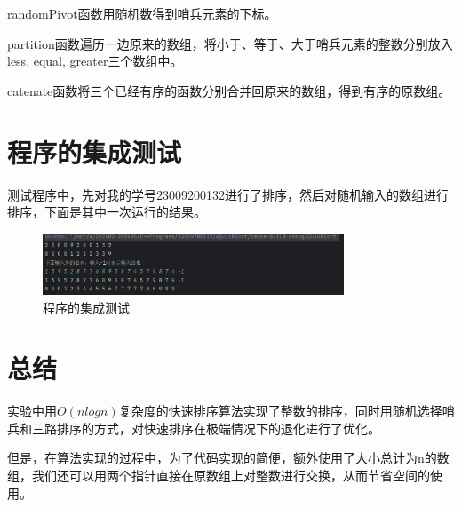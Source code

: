 \documentclass{ctexart}
\begin{document}
    randomPivot函数用随机数得到哨兵元素的下标。
    
    partition函数遍历一边原来的数组，将小于、等于、大于哨兵元素的整数分别放入less, equal, greater三个数组中。
    
    catenate函数将三个已经有序的函数分别合并回原来的数组，得到有序的原数组。
    
    \section{程序的集成测试}
    测试程序中，先对我的学号23009200132进行了排序，然后对随机输入的数组进行排序，下面是其中一次运行的结果。
    
     \begin{figure}[h] %
       \centering
       \includegraphics[width=0.8\textwidth]{tests.png}
       \caption{程序的集成测试}   
     \end{figure}
    
    \section{总结}
    实验中用$O(nlogn)$复杂度的快速排序算法实现了整数的排序，同时用随机选择哨兵和三路排序的方式，对快速排序在极端情况下的退化进行了优化。
    
    但是，在算法实现的过程中，为了代码实现的简便，额外使用了大小总计为n的数组，我们还可以用两个指针直接在原数组上对整数进行交换，从而节省空间的使用。
    
    
\end{document}
